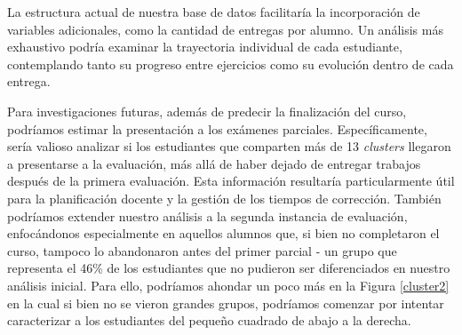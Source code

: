 \documentclass[11pt,a4paper,twoside,openany]{tesis}
\begin{document}
La estructura actual de nuestra base de datos facilitaría la incorporación de variables adicionales, como la cantidad de entregas por alumno. Un análisis más exhaustivo podría examinar la trayectoria individual de cada estudiante, contemplando tanto su progreso entre ejercicios como su evolución dentro de cada entrega.

Para investigaciones futuras, además de predecir la finalización del curso, podríamos estimar la presentación a los exámenes parciales. Específicamente, sería valioso analizar si los estudiantes que comparten más de 13 \emph{clusters} llegaron a presentarse a la evaluación, más allá de haber dejado de entregar trabajos después de la primera evaluación. Esta información resultaría particularmente útil para la planificación docente y la gestión de los tiempos de corrección. También podríamos extender nuestro análisis a la segunda instancia de evaluación, enfocándonos especialmente en aquellos alumnos que, si bien no completaron el curso, tampoco lo abandonaron antes del primer parcial - un grupo que representa el 46\% de los estudiantes que no pudieron ser diferenciados en nuestro análisis inicial. Para ello, podríamos ahondar un poco más en la Figura \ref{cluster2} en la cual si bien no se vieron grandes grupos, podríamos comenzar por intentar caracterizar a los estudiantes del pequeño cuadrado de abajo a la derecha. 
\backmatter


\end{document}

